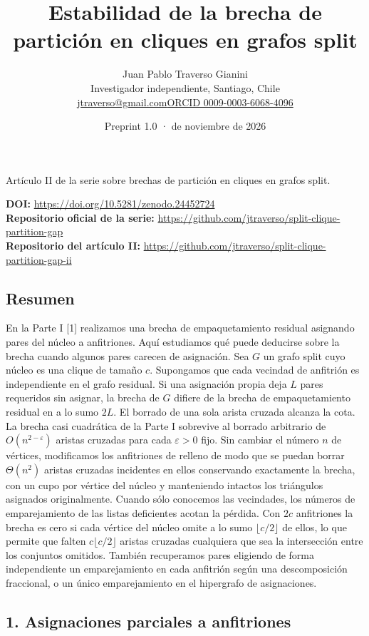 \documentclass[spanish,11pt,a4paper]{article}
\title{Estabilidad de la brecha de partición en cliques en grafos split}
\author{Juan Pablo Traverso Gianini\\\small Investigador independiente, Santiago, Chile\\\small\href{mailto:jtraverso@gmail.com}{jtraverso@gmail.com}\quad\href{https://orcid.org/0009-0003-6068-4096}{ORCID 0009-0003-6068-4096}}
\date{Preprint 1.0 \enspace · \enspace 23 de noviembre de 2026}
\begin{document}
\raggedbottom\maketitle
\begin{center}\small Artículo II de la serie sobre brechas de partición en cliques en grafos split.\end{center}
\noindent\textbf{DOI:} \url{https://doi.org/10.5281/zenodo.24452724}\\
\textbf{Repositorio oficial de la serie:} \url{https://github.com/jtraverso/split-clique-partition-gap}\\
\textbf{Repositorio del artículo II:} \url{https://github.com/jtraverso/split-clique-partition-gap-ii}
\subsection{Resumen}\label{resumen}

En la Parte I {[}1{]} realizamos una brecha de empaquetamiento residual asignando pares del núcleo a anfitriones. Aquí estudiamos qué puede deducirse sobre la brecha cuando algunos pares carecen de asignación. Sea \(G\) un grafo split cuyo núcleo es una clique de tamaño \(c\). Supongamos que cada vecindad de anfitrión es independiente en el grafo residual. Si una asignación propia deja \(L\) pares requeridos sin asignar, la brecha de \(G\) difiere de la brecha de empaquetamiento residual en a lo sumo \(2L\). El borrado de una sola arista cruzada alcanza la cota. La brecha casi cuadrática de la Parte I sobrevive al borrado arbitrario de \(O(n^{2-\varepsilon})\) aristas cruzadas para cada \(\varepsilon>0\) fijo. Sin cambiar el número \(n\) de vértices, modificamos los anfitriones de relleno de modo que se puedan borrar \(\Theta(n^2)\) aristas cruzadas incidentes en ellos conservando exactamente la brecha, con un cupo por vértice del núcleo y manteniendo intactos los triángulos asignados originalmente. Cuando sólo conocemos las vecindades, los números de emparejamiento de las listas deficientes acotan la pérdida. Con \(2c\) anfitriones la brecha es cero si cada vértice del núcleo omite a lo sumo \(\lfloor c/2\rfloor\) de ellos, lo que permite que falten \(c\lfloor c/2\rfloor\) aristas cruzadas cualquiera que sea la intersección entre los conjuntos omitidos. También recuperamos pares eligiendo de forma independiente un emparejamiento en cada anfitrión según una descomposición fraccional, o un único emparejamiento en el hipergrafo de asignaciones.

\subsection{1. Asignaciones parciales a anfitriones}\label{asignaciones-parciales-a-anfitriones}
\end{document}

